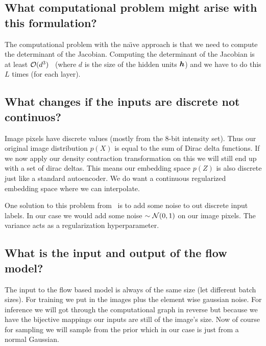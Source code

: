 \documentclass{article}
\begin{document}
\subsection{What computational problem might arise with this formulation?}
The computational problem with the na\"{\i}ve approach is that we need to compute the determinant of the Jacobian.
Computing the determinant of the Jacobian is at least \(\mathcal{O}(d^3)\)~\cite{rezende2015} (where \(d\) is the size of the hidden units \(\B{h}\)) and we have to do this \(L\) times (for each layer).

\subsection{What changes if the inputs are discrete not continuos?}
Image pixels have discrete values (mostly from the 8-bit intensity set).
Thus our original image distribution \(p(X)\) is equal to the sum of Dirac delta functions.
If we now apply our density contraction transformation on this we will still end up with a set of dirac deltas.
This means our embedding space \(p(Z)\) is also discrete just like a standard autoencoder.
We do want a  continuous regularized embedding space where we can interpolate.

One solution to this problem from~\cite{ho2019} is to add some noise to out discrete input labels.
In our case we would add some noise \(\sim \mathcal{N}(0,1)\) on our image pixels.
The variance acts as a regularization hyperparameter.

\subsection{What is the input and output of the flow model?}
The input to the flow based model is always of the same size (let different batch sizes).
For training we put in the images plus the element wise gaussian noise.
For inference we will got through the computational graph in reverse but because we have the bijective mappings our inputs are still of the image's size.
Now of course for sampling we will sample from the prior which in our case is just from a normal Gaussian.
\end{document}
